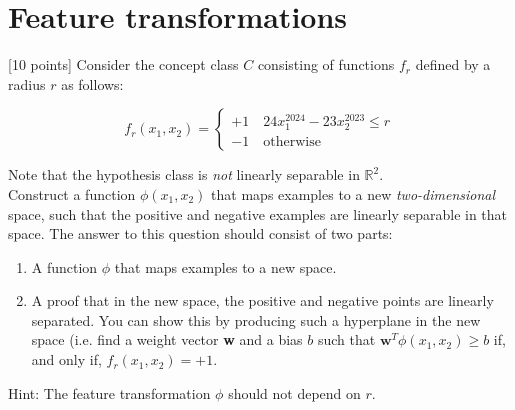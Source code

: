 \section{Feature transformations}\label{sec:q2}

[10 points] Consider the concept class $C$ consisting of functions $f_r$ defined by a radius $r$ as follows:

\begin{equation*}
            f_r(x_1,x_2) = \begin{cases}
                +1 \quad 24x_1^{2024}-23x_2^{2023}\leq r \\
                -1 \quad \text{otherwise}
            \end{cases}
            \label{eq-0}
        \end{equation*}

Note that the hypothesis class is \textit{not} linearly separable in $\mathbb{R}^2$.\\

Construct a function $\phi(x_1,x_2)$ that maps examples to a new \emph{two-dimensional} space, such that the positive and negative examples are linearly separable in that space. The answer to this question should consist of two parts:
\begin{enumerate}
\item A function $\phi$ that maps examples to a new space.
\item A proof that in the new space, the positive and negative points are linearly separated. You can show this by producing such a hyperplane in the new space (i.e. find a weight vector \textbf{w} and a bias $b$ such that $\textbf{w}^T\phi(x_1,x_2)\geq b$ if, and only if, $f_r(x_1,x_2)=+1$.
\end{enumerate}
Hint: The feature transformation $\phi$ should not depend on $r$.

